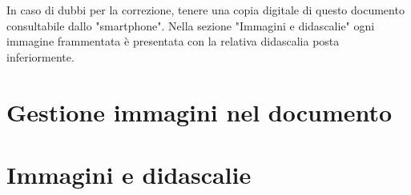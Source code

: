 \documentclass[hidelinks,12pt,a4paper]{article}
\begin{document}
	
	\vspace*{\fill}
	\centering
	\fboxrule=2pt
	\fbox
	{
		\begin{minipage}{\linewidth}
			In caso di dubbi per la correzione, tenere una copia digitale di questo documento consultabile dallo "smartphone". Nella sezione "Immagini e didascalie" ogni immagine frammentata è presentata con la relativa didascalia posta inferiormente.
		\end{minipage}
	}

	\newpage
	\section{Gestione immagini nel documento}
	

	\newpage
	\section{Immagini e didascalie}
	
\end{document}
